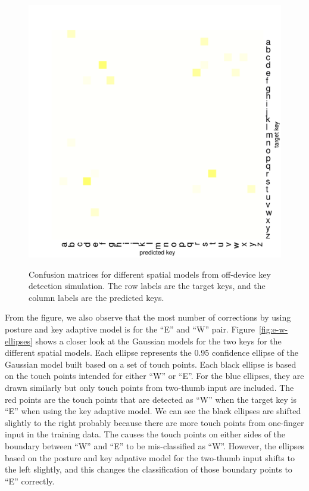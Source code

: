 \documentclass{sigchi}
\begin{document}
\begin{figure}[tb]
{    \includegraphics[width=0.49\columnwidth]{figures/sim-result-2-1.pdf}
    \label{fig:error-posture-key}
	}
	\caption{Confusion matrices for different
	spatial models from off-device key detection simulation. The row labels are the
	target keys, and the column labels are the predicted keys.}
	\label{fig:confusion-matrices}
\end{figure}

From the figure, we also observe that the most number of corrections by using posture
and key adaptive model is for the ``E'' and ``W'' pair. Figure~\ref{fig:e-w-ellipses}
shows a closer look at the Gaussian models for the two keys for the different
spatial models. Each ellipse represents the 0.95 confidence ellipse of the Gaussian model built 
based on a set of touch points.
Each black ellipse is based on the touch points intended for either ``W'' or ``E''. 
For the blue ellipses, they are drawn similarly but only touch points from two-thumb input
are included. The red points are the touch points that are detected as ``W'' when the target
key is ``E'' when using the key adaptive model. We can see the black ellipses are shifted
slightly to the right probably because there are more touch points from one-finger input in the training
data. The causes the touch points on either sides of the boundary between ``W'' and 
``E'' to be mis-classified as ``W''. However, the ellipses based on the posture and key
adpative model for the two-thumb input shifts to the left slightly, and this changes
the classification of those boundary points to ``E'' correctly.
\end{document}
